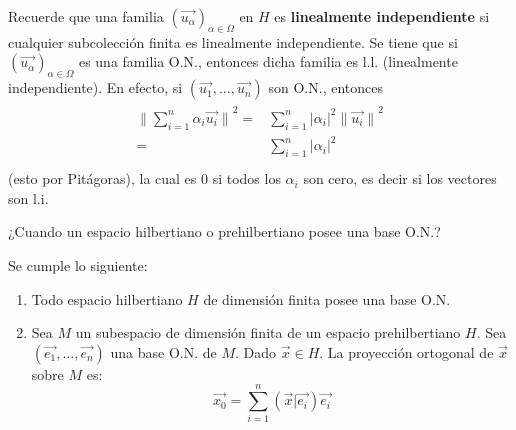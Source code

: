 \documentclass[12pt]{report}
\theoremstyle{largebreak}
\newcommand\abs[1]{\ensuremath{\big|#1\big|}}
\newcommand\norm[1]{\ensuremath{\|#1\|}}
\newcommand\pint[2]{\ensuremath{\left(#1\big| #2\right)}}
\begin{document}
    Recuerde que una familia $\left(\vec{u_\alpha} \right)_{\alpha\in\Omega}$ en $H$ es \textbf{linealmente independiente} si cualquier subcolección finita es linealmente independiente. Se tiene que si $\left(\vec{u_\alpha} \right)_{\alpha\in\Omega}$ es una familia O.N., entonces dicha familia es l.l. (linealmente independiente). En efecto, si $(\vec{u_1},...,\vec{u_n})$ son O.N., entonces
    \begin{eqnarray}
        \begin{split}
            \norm{\sum_{i=1 }^{n}\alpha_i\vec{u_i}}^2=& \sum_{i=1 }^{n}\abs{\alpha_i}^2\norm{\vec{u_i}}^2 \\
            =& \sum_{i=1 }^{n}\abs{\alpha_i}^2 \\
        \end{split}
    \end{eqnarray}
    (esto por Pitágoras), la cual es 0 si todos los $\alpha_i$ son cero, es decir si los vectores son l.i.

    ¿Cuando un espacio hilbertiano o prehilbertiano posee una base O.N.?

    \begin{propo}
        Se cumple lo siguiente:
        \begin{enumerate}
            \item Todo espacio hilbertiano $H$ de dimensión finita posee una base O.N.
            \item Sea $M$ un subespacio de dimensión finita de un espacio prehilbertiano $H$. Sea $(\vec{e_1},...,\vec{e_n})$ una base O.N. de $M$. Dado $\vec{x}\in H$. La proyección ortogonal de $\vec{x}$ sobre $M$ es:
            \begin{equation*}
                \vec{x_0}=\sum_{ i=1}^{n}\pint{\vec{x}}{\vec{e_i}}\vec{e_i}
            \end{equation*}
        \end{enumerate}
    \end{propo}
\end{document}
